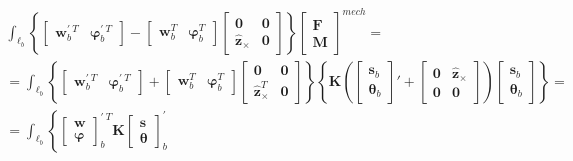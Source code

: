 \documentclass[letterpaper,10pt,english]{jupyterBook}
\begin{document}
\begin{equation*}
\begin{split}\begin{aligned}
  & \int_{\ell_b} \left\{ \begin{bmatrix}  \mathbf{w}_b^{' \ T} & \boldsymbol\varphi_b^{' \ T} \end{bmatrix} - \begin{bmatrix} \mathbf{w}_b^T & \boldsymbol\varphi_b^T \end{bmatrix} \begin{bmatrix} \mathbf{0} & \mathbf{0} \\ \hat{\mathbf{z}}_\times & \mathbf{0} \end{bmatrix} \right\} \begin{bmatrix} \mathbf{F} \\ \mathbf{M} \end{bmatrix}^{mech} = \\
  & = \int_{\ell_b} \left\{ \begin{bmatrix}  \mathbf{w}_b^{' \ T} & \boldsymbol\varphi_b^{' \ T} \end{bmatrix} + \begin{bmatrix} \mathbf{w}_b^T & \boldsymbol\varphi_b^T \end{bmatrix} \begin{bmatrix} \mathbf{0} & \mathbf{0} \\ \hat{\mathbf{z}}^T_\times & \mathbf{0} \end{bmatrix} \right\} \left\{ \mathbf{K} \left( \begin{bmatrix} \mathbf{s}_b \\ \boldsymbol\theta_b \end{bmatrix}' + \begin{bmatrix} \mathbf{0} & \hat{\mathbf{z}}_\times \\ \mathbf{0} & \mathbf{0} \end{bmatrix} \right) \begin{bmatrix} \mathbf{s}_b \\ \boldsymbol{\theta}_b \end{bmatrix} \right\} = \\
  & = \int_{\ell_b} \left\{ \begin{bmatrix} \mathbf{w} \\ \boldsymbol\varphi \end{bmatrix}_b^{' \ T} \mathbf{K} \begin{bmatrix} \mathbf{s} \\ \boldsymbol\theta \end{bmatrix}_b^{'}

\end{aligned}
\end{split}
\end{equation*}
\end{document}
